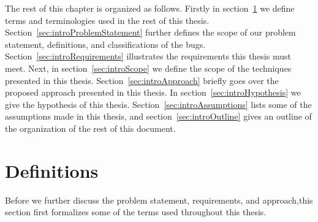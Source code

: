 
The rest of this chapter is organized as follows.
Firstly in section~\ref{sec:introDefinition} we define terms and terminologies used in the rest of this thesis.
Section~\ref{sec:introProblemStatement} further defines the scope of our problem statement, definitions, and classifications of the bugs.
Section~\ref{sec:introRequirements} illustrates the requirements this thesis must meet.
Next, in section~\ref{sec:introScope} we define the scope of the techniques presented in this thesis.
Section~\ref{sec:introApproach} briefly goes over the proposed approach presented in this thesis.
In section~\ref{sec:introHypothesis} we give the hypothesis of this thesis.
Section~\ref{sec:introAssumptions} lists some of the assumptions made in this thesis, and section~\ref{sec:introOutline} gives an outline of the organization of the rest of this document.

\section{Definitions}
\label{sec:introDefinition}

Before we further discuss the problem statement, requirements, and approach,this section first formalizes some of the terms used throughout this thesis.

